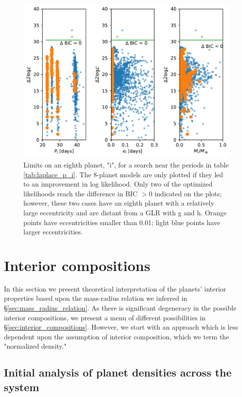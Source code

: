 \documentclass[fleqn,usenatbib]{mnras} %
\begin{document}
\begin{figure}
    \centering
    \includegraphics[width=\hsize]{figures/Planet_i_properties.pdf}
    \caption{Limits on an eighth planet, "i", for a search near
    the periods in table \ref{tab:laplace_p_i}.  The 8-planet
    models are only plotted if they led to an improvement in log likelihood.  
    Only two of the optimized
    likelihoods reach the difference in BIC ${>}0$ indicated on the plots; however, these two cases have an eighth planet with a relatively large eccentricity and are distant from a GLR with g and h.  Orange points have eccentricities smaller than 0.01;  light blue points have larger eccentricities.}
    \label{fig:planet_i}
\end{figure}


\section{Interior compositions}
\label{sec:theoretical_interpretation}

In this section we present theoretical interpretation of the planets'
interior properties based upon the mass-radius relation we inferred in \S \ref{sec:mass_radius_relation}.  As there is significant degeneracy in the possible interior compositions, we present a menu of different possibilities in \S \ref{sec:interior_compositions}.  However, we start with an approach which is less dependent upon the assumption of interior composition, which we term the "normalized density."

\subsection{Initial analysis of planet densities across the system}
\end{document}
